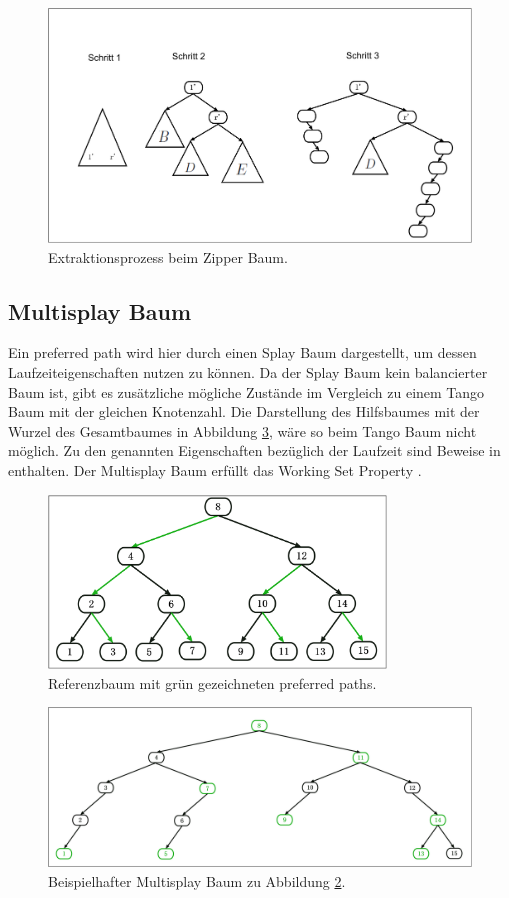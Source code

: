 \documentclass[a4paper,12pt]{article}
\begin{document}
\begin{figure}[H]
	\centering
	\includegraphics[height= 0.5\textwidth]{"Medien/Zipper/hybrid/extractHybrid"}
	\caption{Extraktionsprozess beim Zipper Baum. }
	\label{fig:extractHybrid}
\end{figure}
\subsection{Multisplay Baum}
Ein preferred path wird hier durch einen Splay Baum dargestellt, um dessen Laufzeiteigenschaften nutzen zu können. Da der Splay Baum kein balancierter Baum ist, gibt es zusätzliche mögliche Zustände im Vergleich zu einem Tango Baum mit der gleichen Knotenzahl. Die Darstellung des Hilfsbaumes mit der Wurzel des Gesamtbaumes in Abbildung \ref{fig:pfadRepresentation}, wäre so beim Tango Baum nicht möglich. Zu den genannten Eigenschaften bezüglich der Laufzeit sind Beweise in \cite{multisplay} enthalten. Der Multisplay Baum erfüllt das Working Set Property \cite{porpMultiSplay}. 
\begin{figure}[H]
	\centering
	\includegraphics[width= 0.8\textwidth]{"Medien/Multisplay/referenzTree"}
	\caption {Referenzbaum mit grün gezeichneten preferred paths. }
	\label{fig:referenzTree}
\end{figure} 
\begin{figure}[H]
	\centering
	\includegraphics[width= 1\textwidth]{"Medien/Multisplay/pfadRepresentation"}
	\caption {Beispielhafter Multisplay Baum zu Abbildung \ref{fig:referenzTree}.}
	\label{fig:pfadRepresentation}
\end{figure} 
\end{document}

